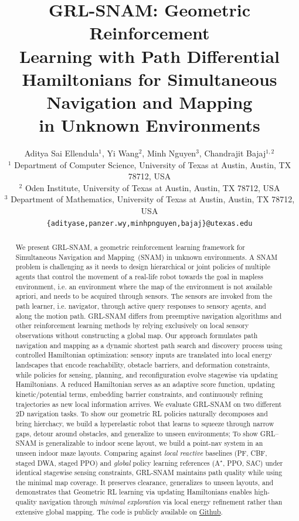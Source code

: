 \documentclass{article} %
\title{GRL-SNAM: Geometric Reinforcement\\ Learning with Path Differential Hamiltonians for Simultaneous Navigation and Mapping\\ in Unknown Environments}
\author{
Aditya Sai Ellendula$^{1}$, Yi Wang$^{2}$, Minh Nguyen$^{3}$, Chandrajit Bajaj$^{1,2}$ \\
$^{1}$ Department of Computer Science, University of Texas at Austin, Austin, TX 78712, USA \\
$^{2}$ Oden Institute, University of Texas at Austin, Austin, TX 78712, USA \\
$^{3}$ Department of Mathematics, University of Texas at Austin, Austin, TX 78712, USA \\
\texttt{\{adityase,panzer.wy,minhpnguyen,bajaj\}@utexas.edu} \\
}
\begin{document}
\usetikzlibrary{matrix}

\maketitle

\begin{abstract}
    We present GRL-SNAM, a geometric reinforcement learning framework for Simultaneous Navigation and Mapping~(SNAM) in unknown environments. A SNAM problem is challenging as it needs to design hierarchical or joint policies of multiple agents that control the movement of a real-life robot towards the goal in mapless environment, i.e. an environment where the map of the environment is not available apriori, and needs to be acquired through sensors. The sensors are invoked from the path learner, i.e. navigator, through active query responses to sensory agents, and along the motion path. GRL-SNAM differs from preemptive navigation algorithms and other reinforcement learning methods by relying exclusively on local sensory observations without constructing a global map. Our approach formulates path navigation and mapping  as a dynamic shortest path search and discovery process using controlled Hamiltonian optimization: sensory inputs are translated into local energy landscapes that encode reachability, obstacle barriers, and deformation constraints, while policies for sensing, planning, and reconfiguration evolve stagewise via updating Hamiltonians. A reduced Hamiltonian serves as an adaptive score function, updating kinetic/potential terms, embedding barrier constraints, and continuously refining trajectories as new local information arrives. We evaluate GRL-SNAM on two different 2D navigation tasks. To show our geometric RL policies naturally decomposes and bring hierchacy, we build a hyperelastic robot that learns to squeeze through narrow gaps, detour around obstacles, and generalize to unseen environments; To show GRL--SNAM is generalizable to indoor scene layout, we build a point-nav system in an unseen indoor maze layouts. Comparing against \emph{local reactive} baselines (PF, CBF, staged DWA, staged PPO) and \emph{global} policy learning references (A$^{\star}$, PPO, SAC) under identical stagewise sensing constraints, GRL-SNAM maintains path quality while using the minimal map coverage. It preserves clearance, generalizes to unseen layouts, and demonstrates that Geometric RL learning via updating Hamiltonians enables high-quality navigation through \emph{minimal exploration} via local energy refinement rather than extensive global mapping. The code is publicly available on \href{https://github.com/CVC-Lab/GRL-SNAM}{Github}.
\end{abstract}
\end{document}
